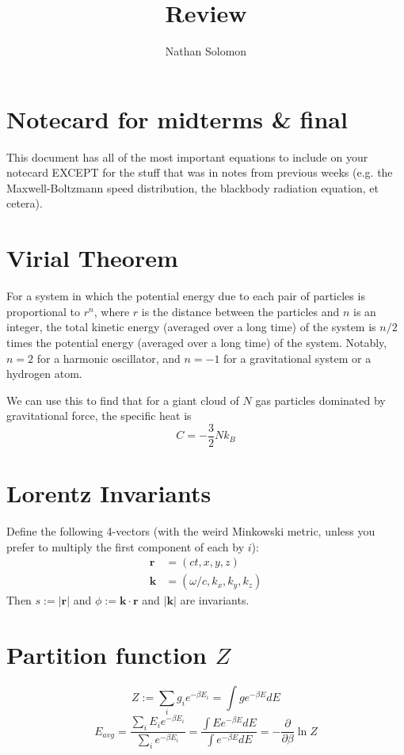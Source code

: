 \documentclass[12pt]{article}
\begin{document}
\title{Review}
\author{Nathan Solomon}
\maketitle

\section{Notecard for midterms \& final}
This document has all of the most important equations to include on your notecard EXCEPT for the stuff that was in notes from previous weeks (e.g. the Maxwell-Boltzmann speed distribution, the blackbody radiation equation, et cetera).

\section{Virial Theorem}
For a system in which the potential energy due to each pair of particles is proportional to $r^n$, where $r$ is the distance between the particles and $n$ is an integer, the total kinetic energy (averaged over a long time) of the system is $n/2$ times the potential energy (averaged over a long time) of the system. Notably, $n=2$ for a harmonic oscillator, and $n=-1$ for a gravitational system or a hydrogen atom.

We can use this to find that for a giant cloud of $N$ gas particles dominated by gravitational force, the specific heat is
\[ C = - \frac{3}{2} N k_B \]

\section{Lorentz Invariants}
Define the following 4-vectors (with the weird Minkowski metric, unless you prefer to multiply the first component of each by $i$):
\begin{align*}
    \boldsymbol{r} &= (ct, x, y, z) \\
    \boldsymbol{k} &= (\omega/c, k_x, k_y, k_z)
\end{align*}
Then $s := |\boldsymbol{r}|$ and $\phi := \boldsymbol{k} \cdot \boldsymbol{r}$ and $|\boldsymbol{k}|$ are invariants.

\section{Partition function $Z$}
\[ Z := \sum_i g_i e^{-\beta E_i} = \int g e^{- \beta E} dE \]
\[E_{avg} = \frac{\sum_i E_i e^{-\beta E_i}}{\sum_i e^{-\beta E_i}} = \frac{\int E e^{-\beta E} dE}{\int e^{-\beta E} dE}  = - \frac{\partial}{\partial \beta} \ln Z\]
\end{document}
